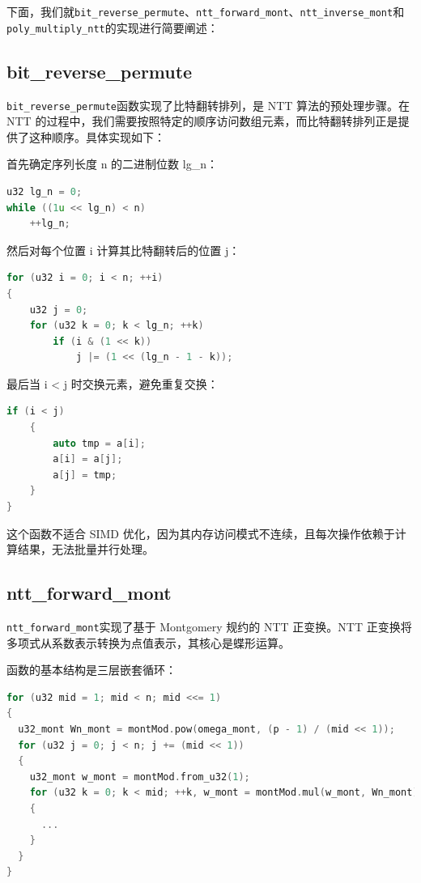 \documentclass[a4paper]{article}
\begin{document}
下面，我们就\texttt{bit\_reverse\_permute}、\texttt{ntt\_forward\_mont}、\texttt{ntt\_inverse\_mont}和\texttt{poly\_multiply\_ntt}的实现进行简要阐述：

\subsection{bit\_reverse\_permute}

\texttt{bit\_reverse\_permute}函数实现了比特翻转排列，是 NTT 算法的预处理步骤。在 NTT 的过程中，我们需要按照特定的顺序访问数组元素，而比特翻转排列正是提供了这种顺序。具体实现如下：

首先确定序列长度 n 的二进制位数 lg\_n：

\begin{lstlisting}[language=C++]
u32 lg_n = 0;
while ((1u << lg_n) < n)
    ++lg_n;
\end{lstlisting}

然后对每个位置 i 计算其比特翻转后的位置 j：

\begin{lstlisting}[language=C++]
for (u32 i = 0; i < n; ++i)
{
    u32 j = 0;
    for (u32 k = 0; k < lg_n; ++k)
        if (i & (1 << k))
            j |= (1 << (lg_n - 1 - k));
\end{lstlisting}

最后当 i < j 时交换元素，避免重复交换：

\begin{lstlisting}[language=C++]
    if (i < j)
    {
        auto tmp = a[i];
        a[i] = a[j];
        a[j] = tmp;
    }
}
\end{lstlisting}

这个函数不适合 SIMD 优化，因为其内存访问模式不连续，且每次操作依赖于计算结果，无法批量并行处理。

\subsection{ntt\_forward\_mont}

\texttt{ntt\_forward\_mont}实现了基于 Montgomery 规约的 NTT 正变换。NTT 正变换将多项式从系数表示转换为点值表示，其核心是蝶形运算。

函数的基本结构是三层嵌套循环：

\begin{lstlisting}[language=C++]
for (u32 mid = 1; mid < n; mid <<= 1)
{
  u32_mont Wn_mont = montMod.pow(omega_mont, (p - 1) / (mid << 1));
  for (u32 j = 0; j < n; j += (mid << 1))
  {
    u32_mont w_mont = montMod.from_u32(1);
    for (u32 k = 0; k < mid; ++k, w_mont = montMod.mul(w_mont, Wn_mont))
    {
      ...
    }
  }
}
\end{lstlisting}
\end{document}

